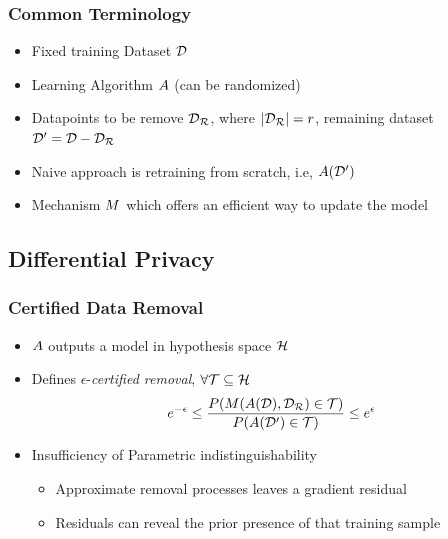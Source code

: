 \documentclass[pdf]{beamer}
\begin{document}
\begin{frame}
  \frametitle{Common Terminology}
  \begin{itemize}
    \item Fixed training Dataset $\mathcal{D}$
    \item Learning Algorithm $A$ (can be randomized)
    \item Datapoints to be remove $\mathcal{D_{R}}$, where $|\mathcal{D_{R}}|=r$, remaining dataset $\mathcal{D}^{\prime}=\mathcal{D} - \mathcal{D_{R}}$
    \item Naive approach is retraining from scratch, i.e, $A(\mathcal{D}^{\prime})$
    \item Mechanism $M$ which offers an efficient way to update the model
  \end{itemize}
\end{frame}

\subsection{Differential Privacy}
\begin{frame}
  \myNset[1]
  \smartart
\end{frame}

\begin{frame}
  \frametitle{Certified Data Removal \cite{guoCertifiedDataRemoval2020}}
  \begin{itemize}
    \item $A$ outputs a model in hypothesis space $\mathcal{H}$
    \item Defines $\epsilon$-\textit{certified removal}, $\forall \mathcal{T} \subseteq \mathcal{H}$
    \[
      e^{-\epsilon} \le \frac{P(M(A(\mathcal{D}),\mathcal{D_{R}})\in \mathcal{T})}{P(A(\mathcal{D}^{\prime})\in \mathcal{T})} \le e^{\epsilon}
    \]
    \item Insufficiency of Parametric indistinguishability
    \begin{itemize}
      \item Approximate removal processes leaves a gradient residual 
      \item Residuals can reveal the prior presence of that training sample
    \end{itemize}
  \end{itemize}
\end{frame}
\end{document}
